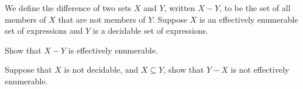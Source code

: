 \begin{problem}
  We define the difference of two sets $X$ and $Y$,
  written $X - Y$, to be the set of all members of $X$
  that are not members of $Y$.
  Suppose $X$ is an effectively enumerable set of expressions
  and $Y$ is a decidable set of expressions.
  \begin{enumalph}
    \item Show that $X - Y$ is effectively enumerable.
    \item Suppose that $X$ is not decidable, and $X \subseteq Y$,
      show that $Y - X$ is not effectively enumerable.
  \end{enumalph}
\end{problem}
